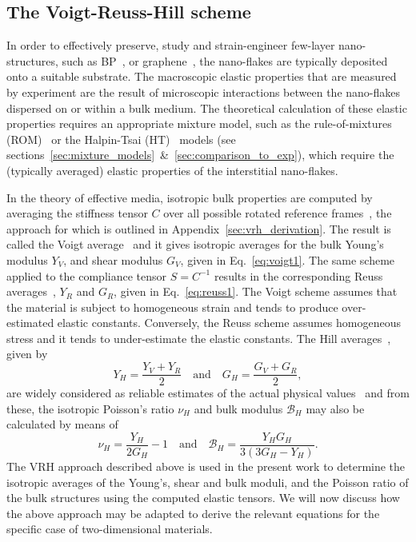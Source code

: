 \subsection{The Voigt-Reuss-Hill scheme}
\label{sec:vrh_scheme}
%
In order to effectively preserve, study and strain-engineer
few-layer nano-structures, 
such as BP~\cite{2053-1583-4-2-021032}, 
or graphene~\cite{R.2010},
the nano-flakes are typically 
deposited onto a suitable substrate.
% 
{
The macroscopic elastic properties 
that are measured by experiment 
are the result of microscopic 
interactions between 
the nano-flakes dispersed  
on or within a bulk medium.}
%
The theoretical calculation of 
these elastic properties 
requires an appropriate mixture model, 
such as the rule-of-mixtures (ROM)~\cite{askeland2011science}
or the Halpin-Tsai (HT)~\cite{doi:10.1177/002199836900300419,PEN:PEN760160512} models 
(see sections~\ref{sec:mixture_models}~\&~\ref{sec:comparison_to_exp}), 
which require the (typically averaged)
elastic properties of the interstitial nano-flakes.
%

In the theory of effective media, 
isotropic bulk properties are 
computed by averaging the stiffness tensor $C$ 
over all possible rotated reference frames~\cite{MULLEN19972247,hearmon1969elastic,0965-0393-7-6-301}, 
the approach for which is 
outlined in Appendix~\ref{sec:vrh_derivation}.
%
The result is called the Voigt average~\cite{ZAMM:ZAMM19290090104,cook1999advanced} 
and it gives isotropic averages for the bulk 
Young's modulus $Y_V$, 
and shear modulus $G_V$, 
given in Eq.~\eqref{eq:voigt1}.
%
The same scheme applied 
to the compliance tensor $S=C^{-1}$ results in 
the corresponding Reuss averages~\cite{ANDP:ANDP18892741206}, 
$Y_R$ and $G_R$, 
given in Eq.~\eqref{eq:reuss1}.
%
The Voigt scheme assumes that 
the material is subject to homogeneous strain 
and tends to produce over-estimated elastic constants.
%
Conversely, 
the Reuss scheme assumes homogeneous stress 
and it tends to under-estimate the elastic constants.
%
The Hill averages~\cite{0370-1298-65-5-307}, given by  
%
\begin{equation}
Y_{H}=\frac{Y_V+Y_R}{2}
\quad\mbox{and}\quad
G_{H}=\frac{G_V+G_R}{2},
\label{eq:hillaverage}
\end{equation}
%
are widely considered as reliable estimates of 
the actual physical values~\cite{0965-0393-7-6-301}
%
and from these, the isotropic Poisson's ratio $\nu_H$ and 
bulk modulus  $\mathcal{B}_H$ may also be calculated 
by means of 
%
\begin{equation}
\nu_H=\frac{Y_H}{2G_H}-1 
\quad\mbox{and}\quad
\mathcal{B}_H=\frac{Y_HG_H}{3(3G_H-Y_H)}.
\label{eq:poisson_ratio}
\end{equation}
%
The VRH approach described above 
is used in the present work to 
determine the isotropic averages of the 
Young's, shear and bulk moduli, 
and the Poisson ratio  
of the bulk structures using 
the computed elastic tensors.
%
We will now discuss how the above 
approach may be adapted 
to derive the relevant equations 
for the specific case 
of two-dimensional materials.

